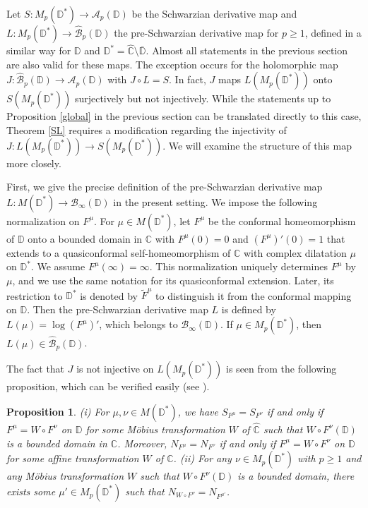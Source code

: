 \documentclass[amstex,12pt,reqno]{amsart}
\newtheorem{proposition}[theorem]{Proposition}
\theoremstyle{definition}
\begin{document}
Let $S:M_p(\mathbb D^*) \to {\mathcal A}_p(\mathbb D)$
be the Schwarzian derivative map and $L:M_p(\mathbb D^*) \to \widehat{\mathcal B}_p(\mathbb D)$
the pre-Schwarzian derivative map for $p \geq 1$, defined in a similar way for $\mathbb D$ and 
$\mathbb D^*=\widehat{\mathbb C} \setminus \overline{\mathbb D}$.
Almost all statements in the previous section are also valid for these maps.
The exception occurs for the holomorphic map 
$J:\widehat {\mathcal B}_p(\mathbb D) \to \mathcal A_p(\mathbb D)$ with $J \circ L=S$.
In fact, $J$ maps $L(M_p(\mathbb D^*))$ onto $S(M_p(\mathbb D^*))$ surjectively but not
injectively.
While the statements up to Proposition \ref{global} in the previous section can be 
translated directly to this case, Theorem \ref{SL} requires a modification regarding the 
injectivity of $J:L(M_p(\mathbb D^*)) \to S(M_p(\mathbb D^*))$. 
We will examine the structure of this map more closely.

First, we give the precise definition of the pre-Schwarzian derivative map
$L:M(\mathbb D^*) \to {\mathcal B}_\infty(\mathbb D)$ in the present setting. 
We impose the following normalization on $F^\mu$. 
For $\mu \in M(\mathbb D^*)$, let $F^\mu$ be the conformal
homeomorphism of $\mathbb D$ onto a bounded domain in $\mathbb C$ with $F^\mu(0)=0$ and $(F^\mu)'(0)=1$
that extends to
a quasiconformal self-homeomorphism of ${\mathbb C}$ with complex dilatation $\mu$ on $\mathbb D^*$. 
We assume $F^\mu(\infty)=\infty$.
This normalization uniquely determines $F^\mu$ by $\mu$, and we use the same notation for its quasiconformal extension.
Later, its restriction to $\mathbb D^*$ is denoted by $\widetilde F^\mu$ to distinguish it from the
conformal mapping on $\mathbb D$.
Then the pre-Schwarzian derivative map $L$ is defined by $L(\mu)=\log (F^\mu)'$, 
which belongs to ${\mathcal B}_\infty(\mathbb D)$. 
If $\mu \in M_p(\mathbb D^*)$, then $L(\mu) \in \widehat{\mathcal B}_p(\mathbb D)$.

The fact that $J$ is not injective on $L(M_p(\mathbb D^*))$ is seen from
the following proposition, which can be verified easily (see \cite[Proposition 3.1]{Ma5}).

\begin{proposition}\label{affine}
{\rm (i)}
For $\mu, \nu \in M(\mathbb D^*)$, we have $S_{F^{\mu}}=S_{F^{\nu}}$ if and only if  
$F^{\mu}=W \circ F^{\nu}$ on $\mathbb D$
for some M\"obius transformation $W$ of $\widehat{\mathbb C}$ such that  
$W \circ F^{\nu}(\mathbb D)$ is a bounded domain in $\mathbb C$. Moreover, $N_{F^{\mu}}=N_{F^{\nu}}$ if and only if
$F^{\mu}=W \circ F^{\nu}$ on $\mathbb D$
for some affine transformation $W$ of $\mathbb C$.
{\rm (ii)}
For any $\nu \in M_p(\mathbb D^*)$ with $p \geq 1$ and any M\"obius transformation $W$ 
such that $W \circ F^{\nu}(\mathbb D)$ is a bounded domain,  
there exists some $\mu' \in M_p(\mathbb D^*)$ such that $N_{W \circ F^{\nu}}=N_{F^{\mu'}}$. 
\end{proposition}
\end{document}

